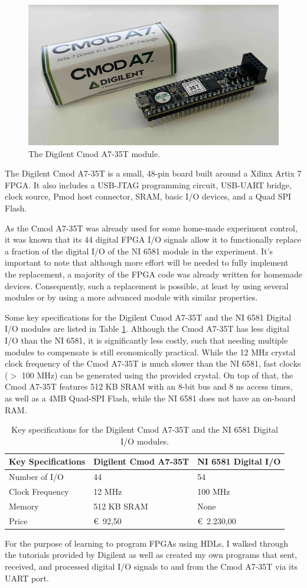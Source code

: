 \begin{figure}[ht]
    \centering
    \includegraphics[width=0.5\columnwidth]{images/chapter_2/digilent.jpeg}
    \caption{The Digilent Cmod A7-35T module.}
    \label{fig:ch2_digilent}
\end{figure}

The Digilent Cmod A7-35T is a small, 48-pin board built around a Xilinx Artix 7 FPGA. It also includes a USB-JTAG programming circuit, USB-UART bridge, clock source, Pmod host connector, SRAM, basic I/O devices, and a Quad SPI Flash.

As the Cmod A7-35T was already used for some home-made experiment control, it was known that its 44 digital FPGA I/O signals allow it to functionally replace a fraction of the digital I/O of the NI 6581 module in the experiment. It's important to note that although more effort will be needed to fully implement the replacement, a majority of the FPGA code was already written for homemade devices. Consequently, such a replacement is possible, at least by using several modules or by using a more advanced module with similar properties.

Some key specifications for the Digilent Cmod A7-35T and the NI 6581 Digital I/O modules are listed in Table \ref{tab:digilent_ni}. Although the Cmod A7-35T has less digital I/O than the NI 6581, it is significantly less costly, such that needing multiple modules to compensate is still economically practical. While the 12 MHz crystal clock frequency of the Cmod A7-35T is much slower than the NI 6581, fast clocks ($>$ 100 MHz) can be generated using the provided crystal. On top of that, the Cmod A7-35T features 512 KB SRAM with an 8-bit bus and 8 ns access times, as well as a 4MB Quad-SPI Flash, while the NI 6581 does not have an on-board RAM.

\begin{table}[h!]
    \centering
    \begin{tabular}{ p{5cm} | p{5cm} | p{5cm} }
        \hline
        \textbf{Key Specifications} & \textbf{Digilent Cmod A7-35T}
            & \textbf{NI 6581 Digital I/O} \\
        \hline
        Number of I/O & 44 & 54 \\
        Clock Frequency & 12 MHz & 100 MHz \\
        Memory & 512 KB SRAM & None \\
        Price & \euro\ 92,50 & \euro\ 2.230,00 \\
        \hline
    \end{tabular}
    \caption{Key specifications for the Digilent Cmod A7-35T and the NI 6581 Digital I/O modules.}
    \label{tab:digilent_ni}
\end{table}

For the purpose of learning to program FPGAs using HDLs, I walked through the tutorials provided by Digilent as well as created my own programs that sent, received, and processed digital I/O signals to and from the Cmod A7-35T via its UART port.